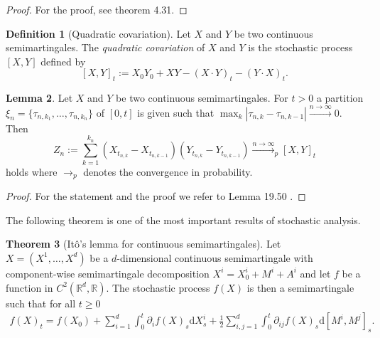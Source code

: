 \documentclass[11pt,titlepage]{article}
\newcommand{\R}{\mathbb{R}} %
\newcommand{\abs}[1]{{\left| #1 \right|}}
\theoremstyle{definition}
\newtheorem{theorem}{Theorem}[section]
\newtheorem{lemma}[theorem]{Lemma}
\newtheorem{definition}[theorem]{Definition}
\theoremstyle{remark}
\begin{document}
	
	\begin{proof}
		For the proof, see \cite{Jacod2003} theorem 4.31.
	\end{proof}

	\begin{definition}[Quadratic covariation]\label{Def quadr covariation}
		Let $X$ and $Y$ be two continuous semimartingales. The \textsl{quadratic covariation} of $X$ and $Y$ is the stochastic process $[X,Y]$ defined by
		\[[X,Y]_t:= X_0Y_0 +XY - (X\cdot Y)_t - (Y\cdot X)_t.\]
	\end{definition}

	\begin{lemma}\label{lemma covariation}
		Let $X$ and $Y$ be two continuous semimartingales. For $t >0$ a partition $\xi_n =\{\tau_{n,k_1},\ldots,\tau_{n,k_n}\}$ of $[0,t]$ is given such that $\max_k \abs{\tau_{n,k}-\tau_{n,k-1}} \xrightarrow{n\to\infty}0$. Then 
		\[Z_n := \sum_{k=1}^{k_n} (X_{t_{n,k}}-X_{t_{n,k-1}})(Y_{t_{n,k}}-Y_{t_{n,k-1}})\xrightarrow{n\to\infty}_p [X,Y]_t\]
		holds where $\to_p$ denotes the convergence in probability.
	\end{lemma}
	
	\begin{proof}
		For the statement and the proof we refer to Lemma 19.50 \cite{Pfaffelhuber2020}.
	\end{proof}

	The following theorem is one of the most important results of stochastic analysis.
	
	\begin{theorem}[Itô's lemma for continuous semimartingales] \label{Itos lemma}
		Let $X=(X^1,\ldots, X^d)$ be a $d$-dimensional continuous semimartingale 
		with component-wise semimartingale decomposition $X^i = X_0^i + M^i + A^i$ and let $f$ be a function in $C^2(\R^d, \R)$. The  stochastic process $f(X)$ is then a semimartingale such that for all $t\geq 0$
		\begin{align*}
			f(X)_t = f(X_0) + \sum_{i=1}^d \int_0^t\partial_i f(X)_s \mathrm{d}X^i_s + 
			\frac{1}{2} \sum_{i,j=1}^d \int_0^t\partial_{ij} f(X)_s \mathrm{d}[M^i, M^j]_s.
		\end{align*}
		
	\end{theorem}
\end{document}
